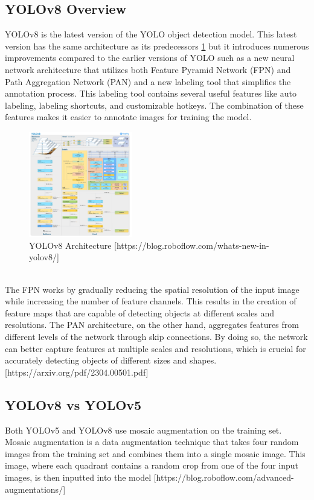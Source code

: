 \documentclass[10pt,twocolumn,letterpaper]{article}
\begin{document}
\subsection{YOLOv8 Overview}
YOLOv8 is the latest version of the YOLO object detection model. This latest version has the same architecture as its predecessors \ref{fig:YOLOv8_arch} but it introduces numerous improvements compared to the earlier versions of YOLO such as a new neural network architecture that utilizes both Feature Pyramid Network (FPN) and Path Aggregation Network (PAN) and a new labeling tool that simplifies the annotation process. This labeling tool contains several useful features like auto labeling, labeling shortcuts, and customizable hotkeys. The combination of these features makes it easier to annotate images for training the model.
\begin{figure}[h]
    \centering
    \includegraphics[width=0.4\textwidth]{figures/YOLOv8_arch.png}
    \caption{YOLOv8 Architecture [https://blog.roboflow.com/whats-new-in-yolov8/]}
    \label{fig:YOLOv8_arch}
\end{figure}
\\
The FPN works by gradually reducing the spatial resolution of the input image while increasing the number of feature channels. This results in the creation of feature maps that are capable of detecting objects at different scales and resolutions. The PAN architecture, on the other hand, aggregates features from different levels of the network through skip connections. By doing so, the network can better capture features at multiple scales and resolutions, which is crucial for accurately detecting objects of different sizes and shapes.[https://arxiv.org/pdf/2304.00501.pdf]\\

\subsection{YOLOv8 vs YOLOv5}
Both YOLOv5 and YOLOv8 use mosaic augmentation on the training set. Mosaic augmentation is a data augmentation technique that takes four random images from the training set and combines them into a single mosaic image. This image, where each quadrant contains a random crop from one of the four input images, is then inputted into the model [https://blog.roboflow.com/advanced-augmentations/]\\
\end{document}
